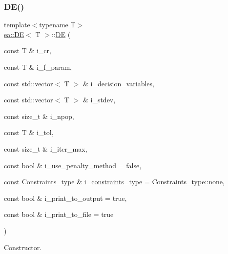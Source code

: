 \subsubsection{\texorpdfstring{D\+E()}{DE()}}
{\footnotesize\ttfamily template$<$typename T$>$ \\
\hyperlink{structea_1_1_d_e}{ea\+::\+DE}$<$ T $>$\+::\hyperlink{structea_1_1_d_e}{DE} (\begin{DoxyParamCaption}\item[{const T \&}]{i\+\_\+cr,  }\item[{const T \&}]{i\+\_\+f\+\_\+param,  }\item[{const std\+::vector$<$ T $>$ \&}]{i\+\_\+decision\+\_\+variables,  }\item[{const std\+::vector$<$ T $>$ \&}]{i\+\_\+stdev,  }\item[{const size\+\_\+t \&}]{i\+\_\+npop,  }\item[{const T \&}]{i\+\_\+tol,  }\item[{const size\+\_\+t \&}]{i\+\_\+iter\+\_\+max,  }\item[{const bool \&}]{i\+\_\+use\+\_\+penalty\+\_\+method = {\ttfamily false},  }\item[{const \hyperlink{namespaceutilities_ab1a1517bf6e62a1acfab5293ca8985c1}{Constraints\+\_\+type} \&}]{i\+\_\+constraints\+\_\+type = {\ttfamily \hyperlink{namespaceea_a8e369877773b4db67b8512efdb4f8f89a334c4a4c42fdb79d7ebc3e73b517e6f8}{Constraints\+\_\+type\+::none}},  }\item[{const bool \&}]{i\+\_\+print\+\_\+to\+\_\+output = {\ttfamily true},  }\item[{const bool \&}]{i\+\_\+print\+\_\+to\+\_\+file = {\ttfamily true} }\end{DoxyParamCaption})\hspace{0.3cm}{\ttfamily [inline]}}



Constructor. 


